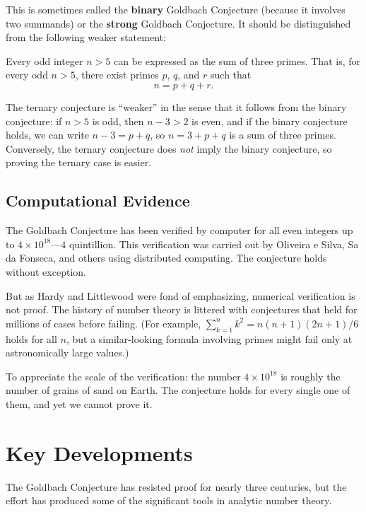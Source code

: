 This is sometimes called the \textbf{binary} Goldbach Conjecture (because it involves two summands) or the \textbf{strong} Goldbach Conjecture. It should be distinguished from the following weaker statement:

\begin{problem_statement}
Every odd integer $n > 5$ can be expressed as the sum of three primes. That is, for every odd $n > 5$, there exist primes $p$, $q$, and $r$ such that
\[
    n = p + q + r.
\]
\end{problem_statement}

The ternary conjecture is ``weaker'' in the sense that it follows from the binary conjecture: if $n > 5$ is odd, then $n - 3 > 2$ is even, and if the binary conjecture holds, we can write $n - 3 = p + q$, so $n = 3 + p + q$ is a sum of three primes. Conversely, the ternary conjecture does \emph{not} imply the binary conjecture, so proving the ternary case is easier.

\subsection{Computational Evidence}

The Goldbach Conjecture has been verified by computer for all even integers up to $4 \times 10^{18}$---$4$ quintillion. This verification was carried out by Oliveira e Silva, Sa da Fonseca, and others using distributed computing. The conjecture holds without exception.

But as Hardy and Littlewood were fond of emphasizing, numerical verification is not proof. The history of number theory is littered with conjectures that held for millions of cases before failing. (For example, $\sum_{k=1}^{n} k^2 = n(n+1)(2n+1)/6$ holds for all $n$, but a similar-looking formula involving primes might fail only at astronomically large values.)

To appreciate the scale of the verification: the number $4 \times 10^{18}$ is roughly the number of grains of sand on Earth. The conjecture holds for every single one of them, and yet we cannot prove it.

\section{Key Developments}

The Goldbach Conjecture has resisted proof for nearly three centuries, but the effort has produced some of the significant tools in analytic number theory.

